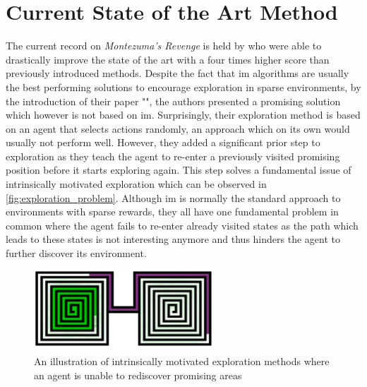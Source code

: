 \documentclass[draft,final]{vutinfth} %
\newcommand{\p}[1]{see p. #1}
\begin{document}
    \section{Current State of the Art Method}

    The current record on \textit{Montezuma's Revenge} is held by \citet{ecoffet_go-explore_2019} who were able to drastically improve the state of the art with a four times higher score than previously introduced methods.
    Despite the fact that \gls{im} algorithms are usually the best performing solutions to encourage exploration in sparse environments, by the introduction of their paper "", the authors presented a promising solution which however is not based on \gls{im}.
    Surprisingly, their exploration method is based on an agent that selects actions randomly, an approach which on its own would usually not perform well.
    However, they added a significant prior step to exploration as they teach the agent to re-enter a previously visited promising position before it starts exploring again.
    This step solves a fundamental issue of intrinsically motivated exploration which can be observed in \autoref{fig:exploration_problem}.
    Although \gls{im} is normally the standard approach to environments with sparse rewards, they all have one fundamental problem in common where the agent fails to re-enter already visited states as the path which leads to these states is not interesting anymore and thus hinders the agent to further discover its environment.

    \begin{figure}[h]
        \centering
        \includegraphics[width=0.60\textwidth]{figures/exploration_problem.png}
        \caption[An illustration of intrinsically motivated exploration methods where an agent is unable to rediscover promising areas]{An illustration of intrinsically motivated exploration methods where an agent is unable to rediscover promising areas\protect\footnotemark}
        \label{fig:exploration_problem}
    \end{figure}

    \footnotetext{\citep[\p{3}]{ecoffet_go-explore_2019}}
\end{document}
